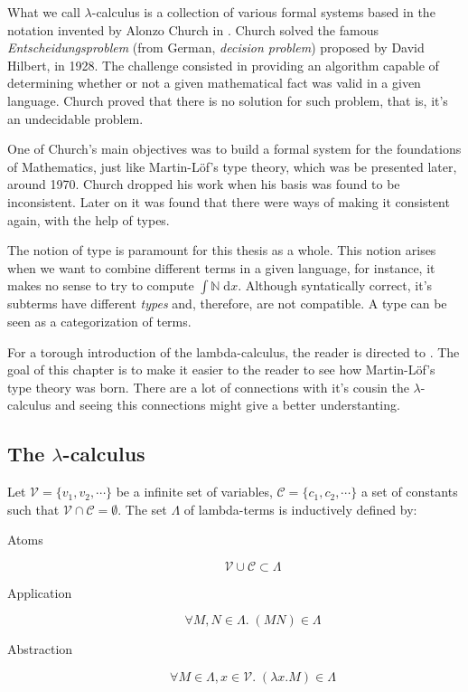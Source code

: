 What we call $\lambda$-calculus is a collection of various formal systems based 
in the notation invented by Alonzo Church in \cite{Church01,Church02}. 
Church solved the famous \textit{Entscheidungsproblem} (from German, \textit{decision problem}) 
proposed by David Hilbert, in 1928. The challenge consisted in providing an algorithm capable
of determining whether or not a given mathematical fact was valid in a given language. 
Church proved that there is no solution for such problem, that is, it's an undecidable problem.

One of Church's main objectives was to build a formal system for the foundations of
Mathematics, just like Martin-Löf's type theory, which was be presented later, around 1970. 
Church dropped his work when his basis was found to be inconsistent. Later on it was found
that there were ways of making it consistent again, with the help of types.

The notion of type is paramount for this thesis as a whole. This notion arises when we want 
to combine different terms in a given language, for instance, it makes no sense to try
to compute $\int \mathbb{N}\;\mathrm{d}x$. Although syntatically correct, it's subterms have
different \emph{types} and, therefore, are not compatible. A type can be seen as a
categorization of terms.

For a torough introduction of the lambda-calculus, the reader is directed to \cite{Barendregt01,Hindley01}.
The goal of this chapter is to make it easier to the reader to see how Martin-Löf's type theory
was born. There are a lot of connections with it's cousin the $\lambda$-calculus and seeing this
connections might give a better understanting. 

\subsection{The $\lambda$-calculus}

\begin{mydef} Let $\mathcal{V} = \{v_1, v_2, \cdots\}$ be a infinite set of
variables, $\mathcal{C}=\{c_1, c_2, \cdots\}$ a set of constants such that 
$\mathcal{V} \cap \mathcal{C} = \emptyset$. The set $\Lambda$ of lambda-terms is 
inductively defined by:
\begin{description}
  \item[Atoms]
        \[ \mathcal{V} \cup \mathcal{C} \subset \Lambda \]
  \item[Application]  
        \[ \forall M, N \in \Lambda.\; (M N) \in \Lambda \]
  \item[Abstraction]
        \[ \forall M \in \Lambda, x \in \mathcal{V}.\; (\lambda x . M) \in \Lambda \]
\end{description}
\end{mydef}

